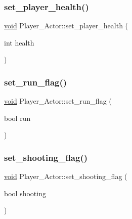 \mbox{\label{classPlayer__Actor_ab68ac6c1ab9b89a379addf1d27a31004}} 
\subsubsection{\texorpdfstring{set\+\_\+player\+\_\+health()}{set\_player\_health()}}
{\footnotesize\ttfamily \hyperlink{imgui__impl__opengl3__loader_8h_ac668e7cffd9e2e9cfee428b9b2f34fa7}{void} Player\+\_\+\+Actor\+::set\+\_\+player\+\_\+health (\begin{DoxyParamCaption}\item[{int}]{health }\end{DoxyParamCaption})\hspace{0.3cm}{\ttfamily [inline]}}

\mbox{\label{classPlayer__Actor_a54802b3729837e379b0b86921058d16c}} 
\subsubsection{\texorpdfstring{set\+\_\+run\+\_\+flag()}{set\_run\_flag()}}
{\footnotesize\ttfamily \hyperlink{imgui__impl__opengl3__loader_8h_ac668e7cffd9e2e9cfee428b9b2f34fa7}{void} Player\+\_\+\+Actor\+::set\+\_\+run\+\_\+flag (\begin{DoxyParamCaption}\item[{bool}]{run }\end{DoxyParamCaption})\hspace{0.3cm}{\ttfamily [inline]}}

\mbox{\label{classPlayer__Actor_a7b35479be808a43b411afac6df0d8465}} 
\subsubsection{\texorpdfstring{set\+\_\+shooting\+\_\+flag()}{set\_shooting\_flag()}}
{\footnotesize\ttfamily \hyperlink{imgui__impl__opengl3__loader_8h_ac668e7cffd9e2e9cfee428b9b2f34fa7}{void} Player\+\_\+\+Actor\+::set\+\_\+shooting\+\_\+flag (\begin{DoxyParamCaption}\item[{bool}]{shooting }\end{DoxyParamCaption})\hspace{0.3cm}{\ttfamily [inline]}}

